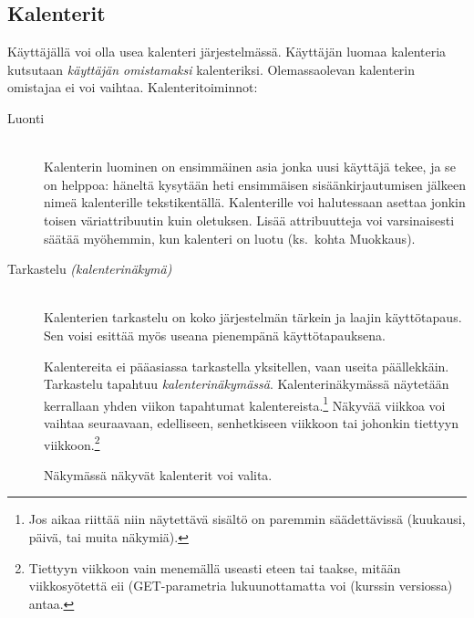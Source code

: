 \documentclass[a4paper,12pt]{report}
\begin{document}
\subsection{Kalenterit}\label{oma_kalenteri}
Käyttäjällä voi olla usea kalenteri järjestelmässä.  Käyttäjän luomaa kalenteria
kutsutaan \emph{käyttäjän omistamaksi} kalenteriksi.  Olemassaolevan kalenterin
omistajaa ei voi vaihtaa.  Kalenteritoiminnot:
\begin{description}
   \item[Luonti] \hfill\\
      Kalenterin luominen on ensimmäinen asia jonka uusi
      käyttäjä tekee, ja se on helppoa: häneltä kysytään heti ensimmäisen
      sisäänkirjautumisen jälkeen nimeä kalenterille tekstikentällä.
      Kalenterille voi halutessaan asettaa jonkin toisen väriattribuutin kuin
      oletuksen.  Lisää attribuutteja voi varsinaisesti säätää myöhemmin, kun
      kalenteri on luotu (ks.\ kohta Muokkaus).

   \item[Tarkastelu {\it (kalenterinäkymä)}] \hfill\\
      Kalenterien tarkastelu on koko järjestelmän tärkein ja laajin
      käyttötapaus.  Sen voisi esittää myös useana pienempänä käyttötapauksena.

      Kalentereita ei pääasiassa tarkastella yksitellen, vaan useita
      päällekkäin.  Tarkastelu tapahtuu \emph{kalenterinäkymässä}.
      Kalenterinäkymässä näytetään kerrallaan yhden viikon tapahtumat
      kalentereista.\footnote{%
         Jos aikaa riittää niin näytettävä sisältö on paremmin säädettävissä
         (kuukausi, päivä, tai muita näkymiä).
      }  Näkyvää viikkoa voi vaihtaa seuraavaan, edelliseen, senhetkiseen
      viikkoon tai johonkin tiettyyn viikkoon.\footnote{Tiettyyn viikkoon vain
         menemällä useasti eteen tai taakse, mitään viikkosyötettä eii
      (GET-parametria lukuunottamatta voi (kurssin versiossa) antaa.}

      Näkymässä näkyvät kalenterit voi valita.


\end{description}
\end{document}
